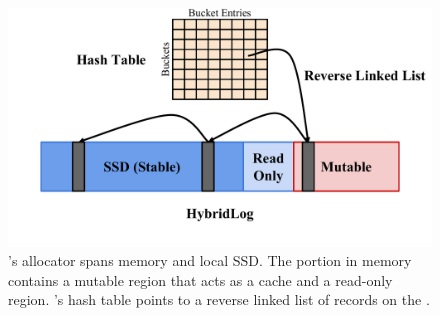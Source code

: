 \begin{figure}[t]
\centering
\includegraphics[width=\columnwidth]{figures/hybrid-log.pdf}
\vspace{-5ex}
\caption{\faster's \hlog allocator spans memory and local SSD.
    The portion in memory contains a mutable region that acts as a
    cache and a read-only region.
    \faster's hash table points to a reverse linked list of
    records on the \hlog.}
\label{fig:hlog}
\end{figure}

